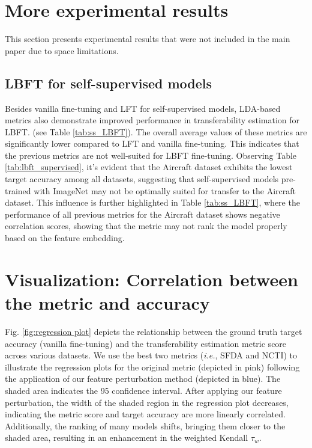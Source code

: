 \section{More experimental results}

This section presents experimental results that were not included in the main paper due to space limitations.

\subsection{LBFT for self-supervised models}

Besides vanilla fine-tuning and LFT for self-supervised models, LDA-based metrics also demonstrate improved performance in transferability estimation for LBFT. (see Table \ref{tab:ss_LBFT}). The overall average values of these metrics are significantly lower compared to LFT and vanilla fine-tuning. This indicates that the previous metrics are not well-suited for LBFT fine-tuning. Observing Table \ref{tab:lbft_supervised}, it's evident that the Aircraft dataset exhibits the lowest target accuracy among all datasets, suggesting that self-supervised models pre-trained with ImageNet may not be optimally suited for transfer to the Aircraft dataset. This influence is further highlighted in Table \ref{tab:ss_LBFT}, where the performance of all previous metrics for the Aircraft dataset shows negative correlation scores, showing that the metric may not rank the model properly based on the feature embedding.






\section{Visualization: Correlation between the metric and accuracy}

Fig. \ref{fig:regression plot} depicts the relationship between the ground truth target accuracy (vanilla fine-tuning) and the transferability estimation metric score across various datasets. We use the best two metrics (\textit{i.e.}, SFDA and NCTI) to illustrate the regression plots for the original metric (depicted in pink) following the application of our feature perturbation method (depicted in blue). The shaded area indicates the 95 confidence interval. After applying our feature perturbation, the width of the shaded region in the regression plot decreases, indicating the metric score and target accuracy are more linearly correlated. Additionally, the ranking of many models shifts, bringing them closer to the shaded area, resulting in an enhancement in the weighted Kendall $\tau_w$. 

